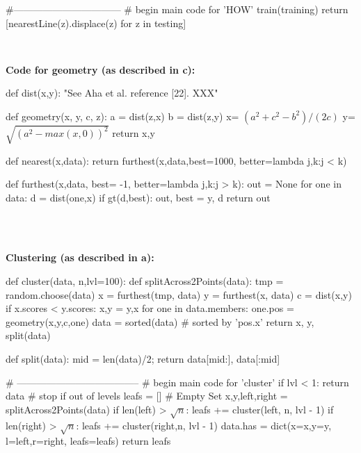 \begin{figure*}
\begin{minipage}{.45\linewidth}
\begin{python}[left]
  #---------------------------------
  # begin main code for  'HOW'
  train(training)
  return [nearestLine(z).displace(z) for z in testing]
\end{python}

~~

{\bf Code for geometry (as described in c):}

 
\begin{python}[left]
def dist(x,y):
   "See Aha et al. reference [22]. XXX"
 
   
def geometry(x, y, c, z): 
  a = dist(z,x)
  b = dist(z,y) 
  x= $(a^2 + c^2 - b^2)/(2c)$ 
  y=  $\sqrt{(a^2 - max(x,0))^2}$
  return x,y
  
def nearest(x,data):
  return furthest(x,data,best=1000,
                    better=lambda j,k:j < k)
 
def furthest(x,data, best= -1, 
                     better=lambda j,k:j > k):  
  out = None
  for one in data:
    d = dist(one,x)
    if gt(d,best): out, best = y, d
  return out
\end{python}
 \end{minipage}~~~~~~~~~\begin{minipage}{.45\linewidth} 
\small

~\\

{\bf Clustering (as described in a):}
\begin{python}[right]
def cluster(data, n,lvl=100):
  def splitAcross2Points(data): 
    tmp = random.choose(data)
    x = furthest(tmp, data)
    y = furthest(x, data) 
    c = dist(x,y)  
    if x.scores < y.scores:
      x,y = y,x 
    for one in data.members: 
      one.pos = geometry(x,y,c,one)
    data = sorted(data) # sorted by 'pos.x'
    return x, y, split(data)
  
  def split(data):   
    mid = len(data)/2; 
    return data[mid:], data[:mid]
    
  # --------------------------------------
  # begin main code for  'cluster'
  if lvl < 1: 
     return data # stop if out of levels
  leafs = [] # Empty Set
  x,y,left,right = splitAcross2Points(data) 
  if len(left) > $\sqrt{n}$:  
     leafs += cluster(left, n, lvl - 1)  
  if len(right) > $\sqrt{n}$:  
     leafs += cluster(right,n,  lvl - 1) 
  data.has = dict(x=x,y=y,
                 l=left,r=right,
                 leafs=leafs)
  return leafs
  

\end{python} 


\end{minipage}
\end{figure*}
